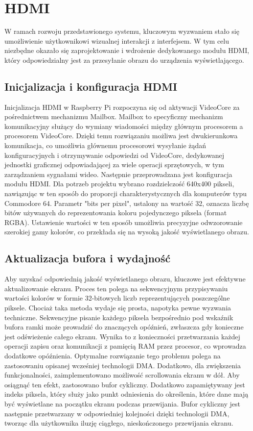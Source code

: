 \documentclass[shortabstract]{iithesis}
\begin{document}
\section{HDMI}
W ramach rozwoju przedstawionego systemu, kluczowym wyzwaniem stało się umożliwienie użytkownikowi wizualnej interakcji z interfejsem. W tym celu niezbędne okazało się zaprojektowanie i wdrożenie dedykowanego modułu HDMI, który odpowiedzialny jest za przesyłanie obrazu do urządzenia wyświetlającego.
\subsection{Inicjalizacja i konfiguracja HDMI}
Inicjalizacja HDMI w Raspberry Pi rozpoczyna się od aktywacji VideoCore za pośrednictwem mechanizmu Mailbox. Mailbox to specyficzny mechanizm komunikacyjny służący do wymiany wiadomości między głównym procesorem a procesorem VideoCore. Dzięki temu rozwiązaniu możliwa jest dwukierunkowa komunikacja, co umożliwia głównemu procesorowi wysyłanie żądań konfiguracyjnych i otrzymywanie odpowiedzi od VideoCore, dedykowanej jednostki graficznej odpowiadającej za wiele operacji sprzętowych, w tym zarządzaniem sygnałami wideo.
Następnie przeprowadzana jest konfiguracja modułu HDMI. Dla potrzeb projektu wybrano rozdzielczość 640x400 pikseli, nawiązując w ten sposób do proporcji charakterystycznych dla komputerów typu Commodore 64. Parametr "bits per pixel", ustalony na wartość 32, oznacza liczbę bitów używanych do reprezentowania koloru pojedynczego piksela (format RGBA). Ustawienie wartości w ten sposób umożliwia precyzyjne odwzorowanie szerokiej gamy kolorów, co przekłada się na wysoką jakość wyświetlanego obrazu.
\subsection{Aktualizacja bufora i wydajność}
Aby uzyskać odpowiednią jakość wyświetlanego obrazu, kluczowe jest efektywne aktualizowanie ekranu. Proces ten polega na sekwencyjnym przypisywaniu wartości kolorów w formie 32-bitowych liczb reprezentujących poszczególne piksele. Chociaż taka metoda wydaje się prosta, napotyka pewne wyzwania techniczne. Sekwencyjne pisanie każdego piksela bezpośrednio pod wskaźnik bufora ramki może prowadzić do znaczących opóźnień, zwłaszcza gdy konieczne jest odświeżenie całego ekranu. Wynika to z konieczności przetwarzania każdej operacji zapisu oraz komunikacji z pamięcią RAM przez procesor, co wprowadza dodatkowe opóźnienia. Optymalne rozwiązanie tego problemu polega na zastosowaniu opisanej wcześniej technologii DMA.
Dodatkowo, dla zwiększenia funkcjonalności, zaimplementowano możliwość scrollowania ekranu w dół. Aby osiągnąć ten efekt, zastosowano bufor cykliczny. Dodatkowo zapamiętywany jest indeks piksela, który służy jako punkt odniesienia do określenia, które dane mają być wyświetlane na początku ekranu podczas przewijania. Bufor cykliczny jest następnie przetwarzany w odpowiedniej kolejności dzięki technologii DMA, tworząc dla użytkownika iluzję ciągłego, nieskończonego przewijania ekranu.
\end{document}
